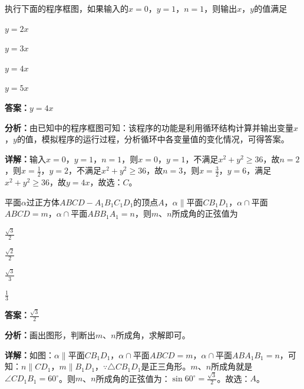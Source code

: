 \begin{question}[points=5]
执行下面的程序框图，如果输入的$x=0$，$y=1$，$n=1$，则输出$x$，$y$的值满足
\begin{choices}
  \item $y=2x$
  \item $y=3x$
  \item $y=4x$
  \item $y=5x$
\end{choices}
\begin{solution}
\textbf{答案：}$y=4x$

\textbf{分析：}由已知中的程序框图可知：该程序的功能是利用循环结构计算并输出变量$x$，$y$的值，模拟程序的运行过程，分析循环中各变量值的变化情况，可得答案。

\textbf{详解：}输入$x=0$，$y=1$，$n=1$，则$x=0$，$y=1$，不满足$x^2+y^2\ge36$，故$n=2$，则$x=\frac{1}{2}$，$y=2$，不满足$x^2+y^2\ge36$，故$n=3$，则$x=\frac{3}{2}$，$y=6$，满足$x^2+y^2\ge36$，故$y=4x$，故选：$C$。
\end{solution}
\end{question}

\begin{question}[points=5]
平面$\alpha$过正方体$ABCD-A_1B_1C_1D_1$的顶点$A$，$\alpha\parallel$平面$CB_1D_1$，$\alpha\cap$平面$ABCD=m$，$\alpha\cap$平面$ABB_1A_1=n$，则$m$、$n$所成角的正弦值为
\begin{choices}
  \item $\frac{\sqrt{3}}{2}$
  \item $\frac{\sqrt{2}}{2}$
  \item $\frac{\sqrt{3}}{3}$
  \item $\frac{1}{3}$
\end{choices}
\begin{solution}
\textbf{答案：}$\frac{\sqrt{3}}{2}$

\textbf{分析：}画出图形，判断出$m$、$n$所成角，求解即可。

\textbf{详解：}如图：$\alpha\parallel$平面$CB_1D_1$，$\alpha\cap$平面$ABCD=m$，$\alpha\cap$平面$ABA_1B_1=n$，可知：$n\parallel CD_1$，$m\parallel B_1D_1$，$\because \triangle CB_1D_1$是正三角形。$m$、$n$所成角就是$\angle CD_1B_1=60^\circ$。则$m$、$n$所成角的正弦值为：$\sin60^\circ=\frac{\sqrt{3}}{2}$。故选：$A$。
\end{solution}
\end{question}

